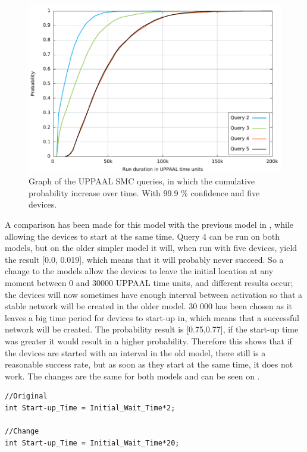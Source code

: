 \begin{figure}[ht]
  \includegraphics[width=1\textwidth]{Figures/Graphs/gnuplot/uppaal/graph.pdf} 
\caption{Graph of the UPPAAL SMC queries, in which the cumulative probability increase over time. With 99.9 \% confidence and five devices.}
\label{fig:ConnectQueryTime}
\end{figure}

\bigskip
\noindent
A comparison has been made for this model with the previous model in , while allowing the devices to start at the same time.
Query 4 can be run on both models, but on the older simpler model it will, when run with five devices, yield the result [0.0, 0.019], which means that it will probably never succeed.
So a change to the models allow the devices to leave the initial location at any moment between 0 and 30000 UPPAAL time units, and different results occur; the devices will now sometimes have enough interval between activation so that a stable network will be created in the older model. 
30 000 has been chosen as it leaves a big time period for devices to start-up in, which means that a successful network will be created.
The probability result is [0.75,0.77], if the start-up time was greater it would result in a higher probability.
Therefore this shows that if the devices are started with an interval in the old model, there still is a reasonable success rate, but as soon as they start at the same time, it does not work. 
The changes are the same for both models and can be seen on . 

\begin{lstlisting}[style=UPPAAL, caption={Change in thestart-up time for devices.}, label={lst:startuptimeChanceListing}, float=h]
//Original
int Start-up_Time = Initial_Wait_Time*2;

//Change
int Start-up_Time = Initial_Wait_Time*20;
\end{lstlisting}


